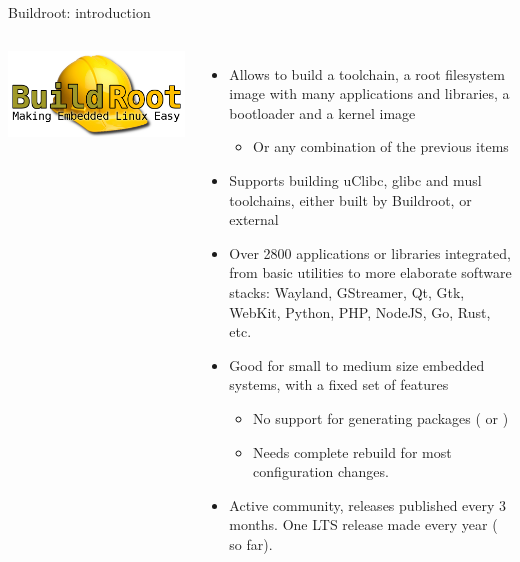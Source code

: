 \begin{frame}{Buildroot: introduction}
  \begin{columns}
    \includegraphics[height=\textwidth,angle=90]{slides/sysdev-build-systems/buildroot-logo.png}
    \begin{itemize}
    \item Allows to build a toolchain, a root filesystem image with many
      applications and libraries, a bootloader and a kernel image
      \begin{itemize}
      \item Or any combination of the previous items
      \end{itemize}
    \item Supports building uClibc, glibc and musl toolchains,
      either built by Buildroot, or external
    \item Over 2800 applications or libraries integrated, from basic
      utilities to more elaborate software stacks: Wayland, GStreamer, Qt,
      Gtk, WebKit, Python, PHP, NodeJS, Go, Rust, etc.
    \item Good for small to medium size embedded systems, with a fixed set of
      features
      \begin{itemize}
      \item No support for generating packages ( or
        )
      \item Needs complete rebuild for most configuration changes.
      \end{itemize}
    \item Active community, releases published every 3 months. One LTS
      release made every year ( so far).
    \end{itemize}
  \end{columns}
\end{frame}

